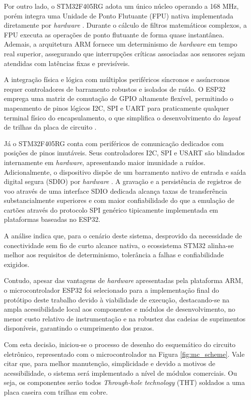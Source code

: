 Por outro lado, o STM32F405RG adota um único núcleo operando a 168 MHz, porém integra uma Unidade de Ponto Flutuante (FPU) nativa implementada diretamente por \textit{hardware} \cite{STM32F405RG_datasheet}. Durante o cálculo de filtros matemáticos complexos, a FPU executa as operações de ponto flutuante de forma quase instantânea. Ademais, a arquitetura ARM fornece um determinismo de \textit{hardware} em tempo real superior, assegurando que interrupções críticas associadas aos sensores sejam atendidas com latências fixas e previsíveis.

A integração física e lógica com múltiplos periféricos síncronos e assíncronos requer controladores de barramento robustos e isolados de ruído. O ESP32 emprega uma matriz de comutação de GPIO altamente flexível, permitindo o mapeamento de pinos lógicos I2C, SPI e UART para praticamente qualquer terminal físico do encapsulamento, o que simplifica o desenvolvimento do \textit{layout} de trilhas da placa de circuito \cite{esp32_datasheet}.

Já o STM32F405RG conta com periféricos de comunicação dedicados com posições de pinos imutáveis. Seus controladores I2C, SPI e USART são blindados internamente em \textit{hardware}, apresentando maior imunidade a ruídos. Adicionalmente, o dispositivo dispõe de um barramento nativo de entrada e saída digital segura (SDIO) por \textit{hardware} \cite{STM32F405RG_datasheet}. A gravação e a persistência de registros de voo através de uma interface SDIO dedicada alcança taxas de transferência substancialmente superiores e com maior confiabilidade do que a emulação de cartões através do protocolo SPI genérico tipicamente implementada em plataformas baseadas no ESP32.

A análise indica que, para o cenário deste sistema, desprovido da necessidade de conectividade sem fio de curto alcance nativa, o ecossistema STM32 alinha-se melhor aos requisitos de determinismo, tolerância a falhas e confiabilidade exigidos.

Contudo, apesar das vantagens de \textit{hardware} apresentadas pela plataforma ARM, o microcontrolador ESP32 foi selecionado para a implementação final do protótipo deste trabalho devido à viabilidade de execução, destacando-se na ampla acessibilidade local aos componentes e módulos de desenvolvimento, no menor custo relativo de instrumentação e na robustez das cadeias de suprimentos disponíveis, garantindo o cumprimento dos prazos.

Com esta decisão, iniciou-se o processo de desenho do esquemático do circuito eletrônico, representado com o microcontrolador na Figura \ref{fig:mc_scheme}. Vale citar que, para melhor manutenção, simplicidade e devido a motivos de acessibilidade, o sistema será implementado a nível de módulos comerciais. Ou seja, os componentes serão todos \textit{Through-hole technology} (THT) soldados a uma placa caseira com trilhas em cobre.

